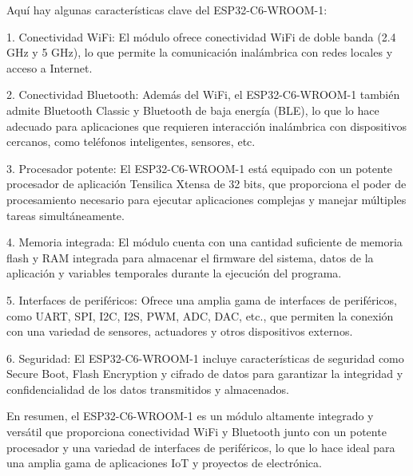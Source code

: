     Aquí hay algunas características clave del ESP32-C6-WROOM-1:
    
    1. Conectividad WiFi: El módulo ofrece conectividad WiFi de doble banda (2.4 GHz y 5 GHz), lo que permite la comunicación inalámbrica con redes locales y acceso a Internet.
    
    2. Conectividad Bluetooth: Además del WiFi, el ESP32-C6-WROOM-1 también admite Bluetooth Classic y Bluetooth de baja energía (BLE), lo que lo hace adecuado para aplicaciones que requieren interacción inalámbrica con dispositivos cercanos, como teléfonos inteligentes, sensores, etc.
    
    3. Procesador potente: El ESP32-C6-WROOM-1 está equipado con un potente procesador de aplicación Tensilica Xtensa de 32 bits, que proporciona el poder de procesamiento necesario para ejecutar aplicaciones complejas y manejar múltiples tareas simultáneamente.
    
    4. Memoria integrada: El módulo cuenta con una cantidad suficiente de memoria flash y RAM integrada para almacenar el firmware del sistema, datos de la aplicación y variables temporales durante la ejecución del programa.
    
    5. Interfaces de periféricos: Ofrece una amplia gama de interfaces de periféricos, como UART, SPI, I2C, I2S, PWM, ADC, DAC, etc., que permiten la conexión con una variedad de sensores, actuadores y otros dispositivos externos.
    
    6. Seguridad: El ESP32-C6-WROOM-1 incluye características de seguridad como Secure Boot, Flash Encryption y cifrado de datos para garantizar la integridad y confidencialidad de los datos transmitidos y almacenados.
    
    En resumen, el ESP32-C6-WROOM-1 es un módulo altamente integrado y versátil que proporciona conectividad WiFi y Bluetooth junto con un potente procesador y una variedad de interfaces de periféricos, lo que lo hace ideal para una amplia gama de aplicaciones IoT y proyectos de electrónica.
    
